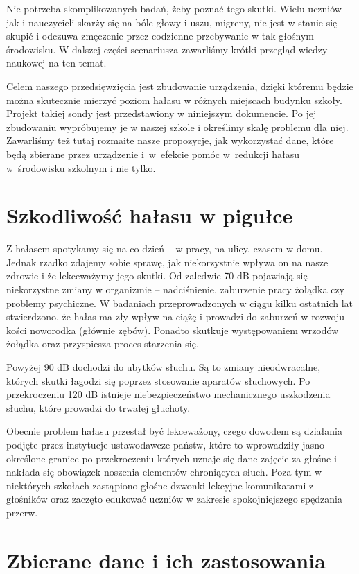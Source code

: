 \documentclass[12pt, a4paper]{article}
\begin{document}
Nie potrzeba skomplikowanych badań, żeby poznać tego skutki. Wielu uczniów jak i nauczycieli skarży się na bóle głowy i uszu, migreny, nie jest w stanie się skupić i odczuwa zmęczenie przez codzienne przebywanie w tak głośnym środowisku. W dalszej części scenariusza zawarliśmy krótki przegląd wiedzy naukowej na ten temat.

Celem naszego przedsięwzięcia jest zbudowanie urządzenia, dzięki któremu będzie można skutecznie mierzyć poziom hałasu w różnych miejscach budynku szkoły. Projekt takiej sondy jest przedstawiony w niniejszym dokumencie. Po jej zbudowaniu wypróbujemy je w naszej szkole i określimy skalę problemu dla niej. Zawarliśmy też tutaj rozmaite nasze propozycje, jak wykorzystać dane, które będą zbierane przez urządzenie i~w~efekcie pomóc w~redukcji hałasu w~środowisku szkolnym i nie tylko.

\section{Szkodliwość hałasu w pigułce}
Z hałasem spotykamy się na co dzień -- w pracy, na ulicy, czasem w domu. Jednak rzadko zdajemy sobie sprawę, jak niekorzystnie wpływa on na nasze zdrowie i że lekceważymy jego skutki. Od zaledwie 70 dB pojawiają się niekorzystne zmiany w organizmie -- nadciśnienie, zaburzenie pracy żołądka czy problemy psychiczne. W badaniach przeprowadzonych w ciągu kilku ostatnich lat stwierdzono, że hałas ma zły wpływ na ciążę i prowadzi do zaburzeń w rozwoju kości noworodka (głównie zębów). Ponadto skutkuje występowaniem wrzodów żołądka oraz przyspiesza proces starzenia się.

Powyżej 90 dB dochodzi do ubytków słuchu. Są to zmiany nieodwracalne, których skutki łagodzi się poprzez stosowanie aparatów słuchowych. Po przekroczeniu 120 dB istnieje niebezpieczeństwo mechanicznego uszkodzenia słuchu, które prowadzi do trwałej głuchoty.

Obecnie problem hałasu przestał być lekceważony, czego dowodem są działania podjęte przez instytucje ustawodawcze państw, które to wprowadziły jasno określone granice po przekroczeniu których uznaje się dane zajęcie za głośne i nakłada się obowiązek noszenia elementów chroniących słuch. Poza tym w niektórych szkołach zastąpiono głośne dzwonki lekcyjne komunikatami z głośników oraz zaczęto edukować uczniów w zakresie spokojniejszego spędzania przerw.

\section{Zbierane dane i ich zastosowania}
\end{document}
